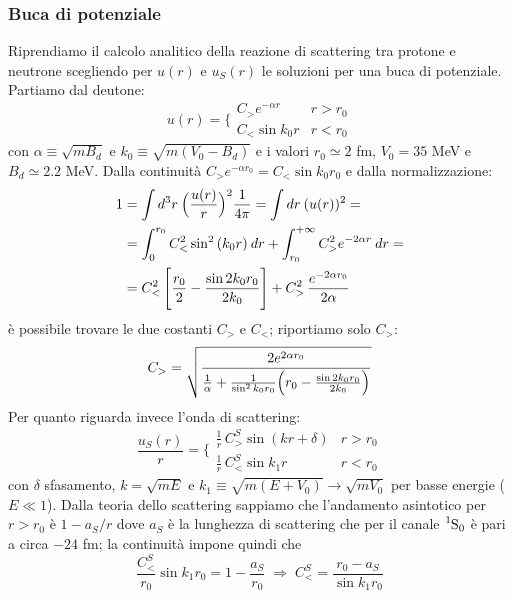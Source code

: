 \subsubsection{Buca di potenziale} Riprendiamo il calcolo analitico della reazione di scattering tra protone e neutrone scegliendo per $u(r)$ e $u_S(r)$ le soluzioni per una buca di potenziale. Partiamo dal deutone:
$$u(r) = \Biggl \{%
\begin{array}{ll}
    C_>e^{-\alpha r} & r>r_0  \\
    C_<\sin{k_0r} & r<r_0
\end{array}%
$$
con $\alpha \equiv \sqrt{mB_d}$ e $k_0\equiv \sqrt{m(V_0-B_d)}$ e i valori $r_0\simeq 2$ fm, $V_0 = 35$ MeV e $B_d \simeq 2.2$ MeV. 
Dalla continuità $C_> e^{-\alpha r_0} = C_<\sin{k_0r_0}$ e dalla normalizzazione:
\begin{displaymath}
\begin{aligned}
1 &= \int d^3r\: \Bigl ( \frac{u(r)}{r} \Bigr )^2 \frac{1}{4\pi} = \int dr \: (u(r))^2 = \\
&= \int_0^{r_0} C_<^2\sin^2{(k_0r)} \: dr + \int_{r_0}^{+\infty} C_>^2 e^{-2\alpha r} \: dr =\\
&= C_<^2 \, \Biggl [ \frac{r_0}{2} - \frac{\sin{2k_0r_0}}{2k_0} \Biggr ] + C_>^2 \, \frac{e^{-2\alpha r_0}}{2\alpha}
\end{aligned}
\end{displaymath}
è possibile trovare le due costanti $C_>$ e $C_<$; riportiamo solo $C_>$:
$$C_> = \sqrt{\frac{2e^{2\alpha r_0}}{\frac{1}{\alpha} +\frac{1}{\sin^2{k_0r_0}}\Bigl ( r_0-\frac{\sin{2k_0r_0}}{2k_0} \Bigr )}}$$
Per quanto riguarda invece l'onda di scattering:
$$\frac{u_S(r)}{r} = \Biggl \{%
\begin{array}{ll}
   \frac{1}{r}\, C^S_>\sin{(kr + \delta)} & r>r_0  \\
   \frac{1}{r}\, C^S_<\sin{k_1r} & r<r_0
\end{array}%
$$
con $\delta$ sfasamento, $k=\sqrt{mE}$ e $k_1\equiv\sqrt{m(E+V_0)}\to\sqrt{mV_0}$ per basse energie ($E\ll 1$). Dalla teoria dello scattering sappiamo che l'andamento asintotico per $r>r_0$ è $1-a_S/r$ dove $a_S$ è la lunghezza di scattering che per il canale $\ce{^1S_0}$ è pari a circa $-24$ fm; la continuità impone quindi che 
$$\frac{C^S_{<}}{r_0}\sin{k_1r_0}=1-\frac{a_S}{r_0} \;\Rightarrow\; C^S_{<} = \frac{r_0 - a_S}{\sin{k_1r_0}}$$
